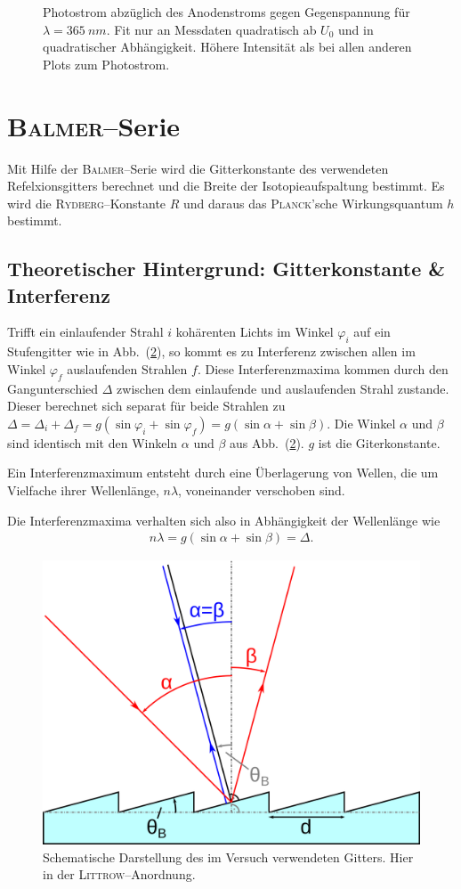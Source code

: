 \documentclass[sn-mathphys-num,iicol]{sn-jnl}
\theoremstyle{thmstyleone}
\theoremstyle{thmstyletwo}
\theoremstyle{thmstylethree}
\begin{document}
\begin{figure}[t]
        \centering
        \resizebox{.5\textwidth}{!}{}
        \caption{Photostrom abzüglich des Anodenstroms gegen Gegenspannung für $\lambda =\SI{365}{n m}$. Fit nur an Messdaten quadratisch ab $U_0$ und in quadratischer Abhängigkeit. Höhere Intensität als bei allen anderen Plots zum Photostrom.} \label{fig:photostrom_hohe_intensität}
\end{figure}

\section{\textsc{Balmer}--Serie}
Mit Hilfe der \textsc{Balmer}--Serie wird die Gitterkonstante des verwendeten Refelxionsgitters berechnet und die Breite der Isotopieaufspaltung bestimmt.
Es wird die \textsc{Rydberg}--Konstante $R$ und daraus das \textsc{Planck}'sche Wirkungsquantum $h$ bestimmt.

\subsection{Theoretischer Hintergrund: Gitterkonstante \& Interferenz}
Trifft ein einlaufender Strahl $i$ kohärenten Lichts im Winkel $\varphi _i$ auf ein Stufengitter wie in Abb.\ (\ref{fig:blazegitter}), so kommt es zu Interferenz zwischen allen im Winkel $\varphi _f$ auslaufenden Strahlen $f$.
Diese Interferenzmaxima kommen durch den Gangunterschied $\Delta $ zwischen dem einlaufende und auslaufenden Strahl zustande.
Dieser berechnet sich separat für beide Strahlen zu $\Delta =\Delta _i+\Delta _f=g\left(\sin \varphi _i+\sin \varphi _f\right)=g\left(\sin \alpha +\sin \beta \right)$.
Die Winkel $\alpha $ und $\beta $ sind identisch mit den Winkeln $\alpha $ und $\beta $ aus Abb.\ (\ref{fig:blazegitter}).
$g$ ist die Giterkonstante.

Ein Interferenzmaximum entsteht durch eine Überlagerung von Wellen, die um Vielfache ihrer Wellenlänge, $n \lambda $, voneinander verschoben sind.

Die Interferenzmaxima verhalten sich also in Abhängigkeit der Wellenlänge wie
\begin{align} 
        n \lambda =g\left(\sin \alpha +\sin \beta \right)=\Delta 
.\end{align} 
\begin{figure}[t]
        \centering
        \includegraphics[width=.5\textwidth]{402_stufengitter.png}
        \caption{Schematische Darstellung des im Versuch verwendeten Gitters. Hier in der \textsc{Littrow}--Anordnung.\cite{WikipediaBlazegitter}} \label{fig:blazegitter}
\end{figure}
\end{document}
